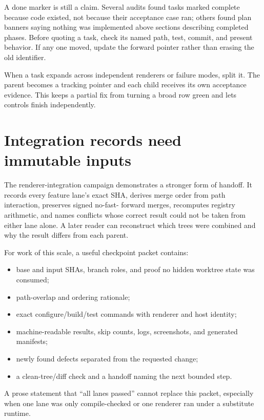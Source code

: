 A done marker is still a claim.  Several audits found tasks marked complete because code existed,
not because their acceptance case ran; others found plan banners saying nothing was implemented
above sections describing completed phases.  Before quoting a task, check its named path, test,
commit, and present behavior.  If any one moved, update the forward pointer rather than erasing the
old identifier.

When a task expands across independent renderers or failure modes, split it.  The parent becomes a
tracking pointer and each child receives its own acceptance evidence.  This keeps a partial fix
from turning a broad row green and lets controls finish independently.

\section{Integration records need immutable inputs}

The renderer-integration campaign demonstrates a stronger form of handoff.  It records every
feature lane's exact SHA, derives merge order from path interaction, preserves signed no-fast-
forward merges, recomputes registry arithmetic, and names conflicts whose correct result could not
be taken from either lane alone.  A later reader can reconstruct which trees were combined and why
the result differs from each parent.

For work of this scale, a useful checkpoint packet contains:

\begin{itemize}
  \item base and input SHAs, branch roles, and proof no hidden worktree state was consumed;
  \item path-overlap and ordering rationale;
  \item exact configure/build/test commands with renderer and host identity;
  \item machine-readable results, skip counts, logs, screenshots, and generated manifests;
  \item newly found defects separated from the requested change;
  \item a clean-tree/diff check and a handoff naming the next bounded step.
\end{itemize}

A prose statement that ``all lanes passed'' cannot replace this packet, especially when one lane
was only compile-checked or one renderer ran under a substitute runtime.

